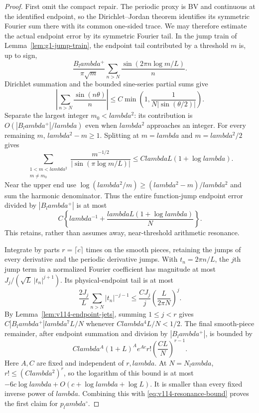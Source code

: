 \documentclass[11pt]{article}
\def\lambda{lambda}%
\theoremstyle{remark}
\begin{document}
\begin{proof}
First omit the compact repair. The periodic proxy is BV and continuous
at the identified endpoint, so the Dirichlet--Jordan theorem identifies
its symmetric Fourier sum there with its common one-sided trace. We may
therefore estimate the actual endpoint error by its symmetric Fourier tail.
In the jump train of
Lemma~\ref{lem:g1-jump-train}, the endpoint tail contributed by a threshold
$m$ is, up to sign,
\[
 \frac{B_\lambda^+}{\pi\sqrt m}
       \sum_{n>N}\frac{\sin(2\pi n\log m/L)}n.
\]
Dirichlet summation and the bounded sine-series partial sums give
\[
 \left|\sum_{n>N}\frac{\sin(n\theta)}n\right|
       \le C\min\left(1,\frac1{N|\sin(\theta/2)|}\right).
\]
Separate the largest integer $m_0<\lambda^2$: its contribution is
$O(|B_\lambda^+|/\lambda)$ even when $\lambda^2$ approaches an integer.
For every remaining $m$, $\lambda^2-m\ge1$. Splitting at $m=\lambda$
and $m=\lambda^2/2$ gives
\[
 \sum_{\substack{1<m<\lambda^2\\m\ne m_0}}
 \frac{m^{-1/2}}{|\sin(\pi\log m/L)|}
       \le C\lambda L(1+\log\lambda).
\]
Near the upper end use
$\log(\lambda^2/m)\ge(\lambda^2-m)/\lambda^2$ and sum the harmonic
denominator. Thus the entire function-jump endpoint error divided by
$|B_\lambda^+|$ is at most
\begin{equation}\label{eq:v114-resonance-bound}
 C\left\{\lambda^{-1}+\frac{\lambda L(1+\log\lambda)}N\right\}.
\end{equation}
This retains, rather than assumes away, near-threshold arithmetic resonance.

Integrate by parts $r=\lceil c\rceil$ times on the smooth pieces, retaining
the jumps of every derivative and the periodic derivative jumps. With
$t_n=2\pi n/L$, the $j$th jump term in a normalized Fourier coefficient
has magnitude at most $J_j/(\sqrt L\,|t_n|^{j+1})$. Its physical-endpoint
tail is at most
\[
 \frac{2J_j}{L}\sum_{n>N}|t_n|^{-j-1}
       \le \frac{C J_j}{j}\left(\frac L{2\pi N}\right)^j.
\]
By Lemma~\ref{lem:v114-endpoint-jets}, summing $1\le j<r$ gives
$C|B_\lambda^+|\lambda^7L/N$ whenever $C\lambda^4L/N<1/2$.
The final smooth-piece remainder, after endpoint summation and division by
$|B_\lambda^+|$, is bounded by
\begin{equation}\label{eq:v114-analytic-tail}
 C\lambda^A(1+L)^Ae^{Ac}r!
                 \left(\frac{CL}{N}\right)^{r-1}.
\end{equation}
Here $A,C$ are fixed and independent of $r,\lambda$.
At $N=N_\lambda$, $r!\le(C\lambda^2)^r$, so the logarithm of this bound
is at most $-6c\log\lambda+O(c+\log\lambda+\log L)$.
It is smaller than every fixed inverse power of $\lambda$.
Combining this with \eqref{eq:v114-resonance-bound} proves the first
claim for $p_\lambda^\circ$.


\end{proof}
\end{document}
